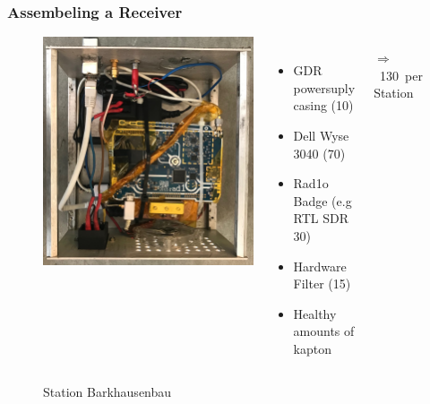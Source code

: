 \documentclass[aspectratio=169]{beamer}
\begin{document}
\begin{frame}
\frametitle{Assembeling a Receiver}

\begin{figure}
\begin{columns}
\begin{center}
\includegraphics[height=0.7\textheight]{figs/station_barkhausen.jpg}
\end{center}
\raggedright
\caption{Station Barkhausenbau}
\vspace{0.5cm}

\begin{itemize}
  \item GDR powersuply casing (10\texteuro)
  \item Dell Wyse 3040 (70\texteuro)
  \item Rad1o Badge (e.g RTL SDR 30\texteuro)
  \item Hardware Filter (15\texteuro)
  \item Healthy amounts of kapton
\end{itemize}

$\Rightarrow$ ~130\texteuro \ per Station

\end{columns}
\end{figure}

\end{frame}
\end{document}
